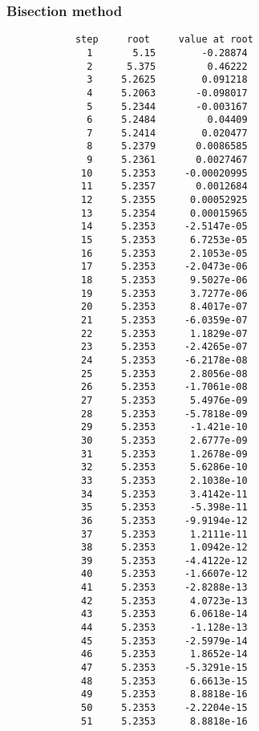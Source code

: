 \documentclass{article}
\begin{document}
	\subsubsection{Bisection method}
	
	\begin{multicols}{2}
		\begin{verbatim}
			step     root     value at root
			  1       5.15        -0.28874 
			  2      5.375         0.46222 
			  3     5.2625        0.091218 
			  4     5.2063       -0.098017 
			  5     5.2344       -0.003167 
			  6     5.2484         0.04409 
			  7     5.2414        0.020477 
			  8     5.2379       0.0086585 
			  9     5.2361       0.0027467 
			 10     5.2353     -0.00020995 
			 11     5.2357       0.0012684 
			 12     5.2355      0.00052925 
			 13     5.2354      0.00015965 
			 14     5.2353     -2.5147e-05 
			 15     5.2353      6.7253e-05 
			 16     5.2353      2.1053e-05 
			 17     5.2353     -2.0473e-06 
			 18     5.2353      9.5027e-06 
			 19     5.2353      3.7277e-06 
			 20     5.2353      8.4017e-07 
			 21     5.2353     -6.0359e-07 
			 22     5.2353      1.1829e-07 
			 23     5.2353     -2.4265e-07 
			 24     5.2353     -6.2178e-08 
			 25     5.2353      2.8056e-08 
			 26     5.2353     -1.7061e-08 
			 27     5.2353      5.4976e-09 
			 28     5.2353     -5.7818e-09 
			 29     5.2353      -1.421e-10 
			 30     5.2353      2.6777e-09 
			 31     5.2353      1.2678e-09 
			 32     5.2353      5.6286e-10 
			 33     5.2353      2.1038e-10 
			 34     5.2353      3.4142e-11 
			 35     5.2353      -5.398e-11 
			 36     5.2353     -9.9194e-12 
			 37     5.2353      1.2111e-11 
			 38     5.2353      1.0942e-12 
			 39     5.2353     -4.4122e-12 
			 40     5.2353     -1.6607e-12 
			 41     5.2353     -2.8288e-13 
			 42     5.2353      4.0723e-13 
			 43     5.2353      6.0618e-14 
			 44     5.2353      -1.128e-13 
			 45     5.2353     -2.5979e-14 
			 46     5.2353      1.8652e-14 
			 47     5.2353     -5.3291e-15 
			 48     5.2353      6.6613e-15 
			 49     5.2353      8.8818e-16 
			 50     5.2353     -2.2204e-15 
			 51     5.2353      8.8818e-16
		\end{verbatim}
	\end{multicols}
	
	\newpage
	
\end{document}
